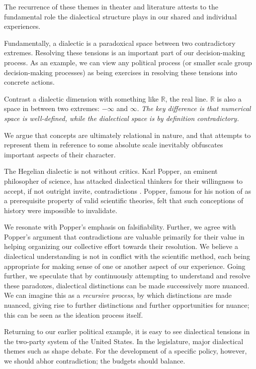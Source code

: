 The recurrence of these themes in theater and literature attests to the fundamental role the dialectical structure plays in our shared and individual experiences.

Fundamentally, a dialectic is a paradoxical space between two contradictory extremes.
Resolving these tensions is an important part of our decision-making process.
As an example, we can view any political process (or smaller scale group decision-making processes) as being exercises in resolving these tensions into concrete actions.

Contrast a dialectic dimension with something like $\mathbb{R}$, the real line.
$\mathbb{R}$ is also a space in between two extremes: $-\infty$ and $\infty$.
\textit{The key difference is that numerical space is well-defined, while the dialectical space is by definition contradictory.}

We argue that concepts are ultimately relational in nature, and that attempts to represent them in reference to some absolute scale inevitably obfuscates important aspects of their character.

The Hegelian dialectic is not without critics.
Karl Popper, an eminent philosopher of science, has attacked dialectical thinkers for their willingness to accept, if not outright invite, contradictions \cite{popper}.
Popper, famous for his notion of  as a prerequisite property of valid scientific theories, felt that such conceptions of history were impossible to invalidate.

We resonate with Popper's emphasis on falsifiability.
Further, we agree with Popper's argument that contradictions are valuable primarily for their value in helping organizing our collective effort towards their resolution.
We believe a dialectical understanding is not in conflict with the scientific method, each being appropriate for making sense of one or another aspect of our experience.
Going further, we speculate that by continuously attempting to understand and resolve these paradoxes, dialectical distinctions can be made successively more nuanced.
We can imagine this as a \textit{recursive process}, by which distinctions are made nuanced, giving rise to further distinctions and further opportunities for nuance; this can be seen as the ideation process itself.

\bigskip

Returning to our earlier political example, it is easy to see dialectical tensions in the two-party system of the United States.
In the legislature, major dialectical themes such as  shape debate.
For the development of a specific policy, however, we should abhor contradiction; the budgets should balance.

